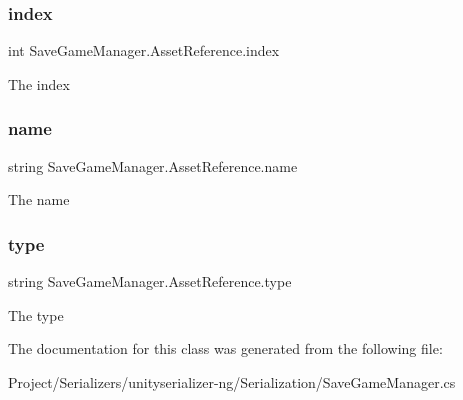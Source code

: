 \subsubsection{\texorpdfstring{index}{index}}
{\footnotesize\ttfamily int Save\+Game\+Manager.\+Asset\+Reference.\+index}



The index 

\mbox{\label{class_save_game_manager_1_1_asset_reference_a79781c3cdd4d102af7416a7ba6e22f36}} 
\subsubsection{\texorpdfstring{name}{name}}
{\footnotesize\ttfamily string Save\+Game\+Manager.\+Asset\+Reference.\+name}



The name 

\mbox{\label{class_save_game_manager_1_1_asset_reference_a8576431a922c1ac4d860c29f1742de96}} 
\subsubsection{\texorpdfstring{type}{type}}
{\footnotesize\ttfamily string Save\+Game\+Manager.\+Asset\+Reference.\+type}



The type 



The documentation for this class was generated from the following file\+:\begin{DoxyCompactItemize}
\item 
Project/\+Serializers/unityserializer-\/ng/\+Serialization/Save\+Game\+Manager.\+cs\end{DoxyCompactItemize}
